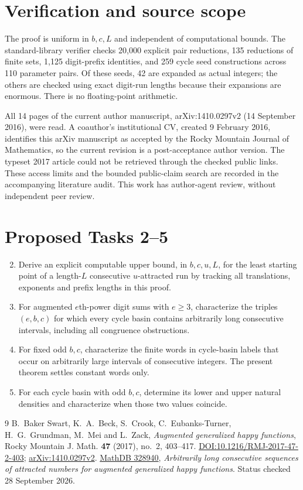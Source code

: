 \documentclass[11pt]{article}
\begin{document}
\section*{Verification and source scope}
The proof is uniform in $b,c,L$ and independent of computational bounds.
The standard-library verifier checks 20,000 explicit pair reductions,
135 reductions of finite sets, 1,125 digit-prefix identities, and 259
cycle seed constructions across 110 parameter pairs. Of these seeds,
42 are expanded as actual integers; the others are checked using exact
digit-run lengths because their expansions are enormous. There is no
floating-point arithmetic.

All 14 pages of the current author manuscript, arXiv:1410.0297v2
(14 September 2016), were read. A coauthor's institutional CV, created
9 February 2016, identifies this arXiv manuscript as accepted by the
Rocky Mountain Journal of Mathematics, so the current revision is a
post-acceptance author version. The typeset 2017 article could not be
retrieved through the checked public links. These access limits and the
bounded public-claim search are recorded in the accompanying literature
audit. This work has author-agent review, without independent peer review.

\section*{Proposed Tasks 2--5}
\begin{enumerate}
\setcounter{enumi}{1}
\item Derive an explicit computable upper bound, in $b,c,u,L$, for the
least starting point of a length-$L$ consecutive $u$-attracted run by
tracking all translations, exponents and prefix lengths in this proof.
\item For augmented $e$th-power digit sums with $e\ge3$, characterize
the triples $(e,b,c)$ for which every cycle basin contains arbitrarily
long consecutive intervals, including all congruence obstructions.
\item For fixed odd $b,c$, characterize the finite words in cycle-basin
labels that occur on arbitrarily large intervals of consecutive integers.
The present theorem settles constant words only.
\item For each cycle basin with odd $b,c$, determine its lower and upper
natural densities and characterize when those two values coincide.
\end{enumerate}

\begin{thebibliography}{9}
 B.~Baker Swart, K.~A.~Beck, S.~Crook,
C.~Eubanks-Turner, H.~G.~Grundman, M.~Mei and L.~Zack,
\emph{Augmented generalized happy functions}, Rocky Mountain J. Math.
\textbf{47} (2017), no.~2, 403--417.
\href{https://doi.org/10.1216/RMJ-2017-47-2-403}{DOI:10.1216/RMJ-2017-47-2-403};
\href{https://arxiv.org/abs/1410.0297}{arXiv:1410.0297v2}.
 \href{https://mathdb.com/p/328940}{MathDB 328940},
\emph{Arbitrarily long consecutive sequences of attracted numbers for
augmented generalized happy functions}. Status checked 28 September 2026.
\end{thebibliography}
\end{document}
